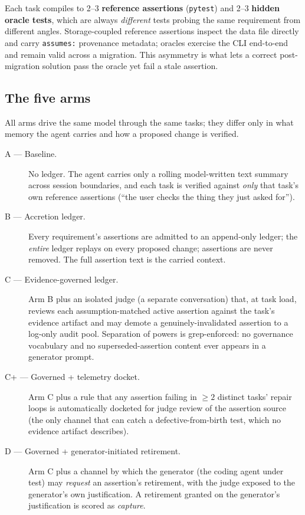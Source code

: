 \documentclass[11pt]{article}
\begin{document}
Each task compiles to 2--3 \textbf{reference assertions} (\texttt{pytest})
and 2--3 \textbf{hidden oracle tests}, which are always \emph{different}
tests probing the same requirement from different angles. Storage-coupled
reference assertions inspect the data file directly and carry
\texttt{assumes:} provenance metadata; oracles exercise the CLI end-to-end
and remain valid across a migration. This asymmetry is what lets a correct
post-migration solution pass the oracle yet fail a stale assertion.

\subsection{The five arms}

All arms drive the same model through the same tasks; they differ only in
what memory the agent carries and how a proposed change is verified.

\begin{description}
\item[A --- Baseline.] No ledger. The agent carries only a rolling
model-written text summary across session boundaries, and each task is
verified against \emph{only} that task's own reference assertions
(``the user checks the thing they just asked for'').
\item[B --- Accretion ledger.] Every requirement's assertions are admitted to
an append-only ledger; the \emph{entire} ledger replays on every proposed
change; assertions are never removed. The full assertion text is the carried
context.
\item[C --- Evidence-governed ledger.] Arm B plus an isolated judge (a
separate conversation) that, at task load, reviews each assumption-matched
active assertion against the task's evidence artifact and may demote a
genuinely-invalidated assertion to a log-only audit pool. Separation of
powers is grep-enforced: no governance vocabulary and no superseded-assertion
content ever appears in a generator prompt.
\item[C+ --- Governed + telemetry docket.] Arm C plus a rule that any
assertion failing in $\geq 2$ distinct tasks' repair loops is automatically
docketed for judge review of the assertion source (the only channel that can
catch a defective-from-birth test, which no evidence artifact describes).
\item[D --- Governed + generator-initiated retirement.] Arm C plus a channel
by which the generator (the coding agent under test) may \emph{request} an
assertion's retirement, with the judge exposed to the generator's own
justification. A retirement granted on the generator's justification is
scored as \emph{capture}.
\end{description}
\end{document}
